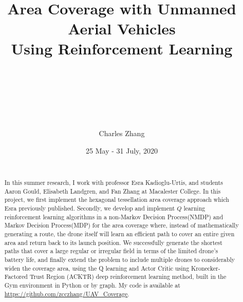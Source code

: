 \documentclass{article}
\begin{document}
\title{ \normalsize 
		\\ [2.5cm] \\
		\LARGE \textbf{Area Coverage with Unmanned Aerial Vehicles\\Using Reinforcement Learning}
		\\ [0.5cm] \\}

\author{ \\\\  \\\\ Charles Zhang}

\date{25 May - 31 July, 2020 \\ [3.5cm] \\}

\maketitle

{
  \hypersetup{linkcolor=black}
  \tableofcontents
}
\newpage
{}
\begin{abstract} 

{
\hypersetup{linkcolor=black}
\noindent In this summer research, I work with professor Esra Kadioglu-Urtis, and students Aaron Gould, Elisabeth Landgren, and Fan Zhang at Macalester College. In this project, we first implement the hexagonal tessellation area coverage approach which Esra previously published. Secondly, we develop and implement $Q$ learning reinforcement learning algorithms in a non-Markov Decision Process(NMDP) and Markov Decision Process(MDP) for the area coverage where, instead of mathematically generating a route, the drone itself will learn an efficient path to cover an entire given area and return back to its launch position. We successfully generate the shortest paths that cover a large regular or irregular field in terms of the limited drone's battery life, and finally extend the problem to include multiple drones to considerably widen the coverage area, using the Q learning and Actor Critic using Kronecker-Factored Trust Region (ACKTR) deep reinforcement learning method, built in the Gym environment in Python or by graph. My code is available at \href{https://github.com/zcczhang/UAV_Coverage}{\color{black}https://github.com/zcczhang/UAV\_Coverage}.
}
\end{abstract}
\end{document}
